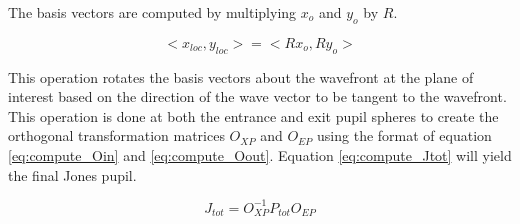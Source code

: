 The basis vectors are computed by multiplying $x_{o}$ and $y_{o}$ by $R$.

\begin{equation}
	<x_{loc},y_{loc}> = <R x_{o}, R y_{o}> 
\end{equation}

This operation rotates the basis vectors about the wavefront at the plane of interest based on the direction of the wave vector to be tangent to the wavefront. This operation is done at both the entrance and exit pupil spheres to create the orthogonal transformation matrices $O_{XP}$ and $O_{EP}$ using the format of equation \ref{eq:compute_Oin} and \ref{eq:compute_Oout}. Equation \ref{eq:compute_Jtot} will yield the final Jones pupil.

\begin{equation}
	J_{tot} = O_{XP}^{-1} P_{tot} O_{EP}
	\label{eq:compute_Jtot}
\end{equation}



